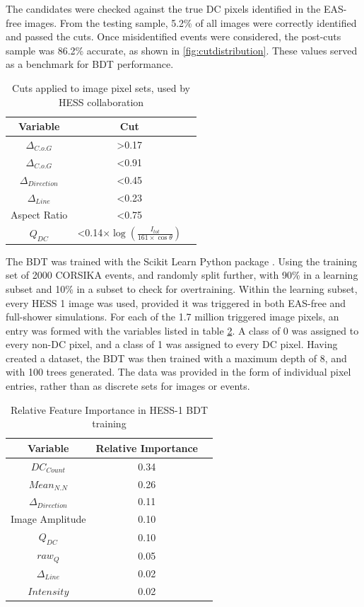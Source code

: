 \documentclass[]{article}
\begin{document}
The candidates were checked against the true DC pixels identified in the EAS-free images. From the testing sample, 5.2\% of all images were correctly identified and passed the cuts. Once misidentified events were considered, the post-cuts sample was 86.2\% accurate, as shown in \ref{fig:cutdistribution}. These values served as a benchmark for BDT performance. 

\begin{table}[h!]
  \centering
  \caption{Cuts applied to image pixel sets, used by HESS collaboration \cite{hess07}}
  \label{tab:table1}
  \begin{tabular}{ccc}
    \toprule
    Variable & Cut\\
    \midrule
     $ \Delta_{C.o.G}$ & \textgreater 0.17 \\
     $ \Delta_{C.o.G}$ & \textless 0.91 \\
     $\Delta_{Direction}$ & \textless 0.45 \\
     $\Delta_{Line}$ & \textless 0.23 \\
     Aspect Ratio & \textless 0.75 \\
     $Q_{DC}$ & \textless 0.14$ \times \log(\frac{I_{tot}}{161 \times \cos \theta})$ \\
    \bottomrule
  \end{tabular}
\end{table}

The BDT was trained with the Scikit Learn Python package \cite{scikit-learn}. Using the training set of 2000 CORSIKA events, and randomly split further, with 90\% in a learning subset and 10\% in a subset to check for overtraining. Within the learning subset, every HESS 1 image was used, provided it was triggered in both EAS-free and full-shower simulations. For each of the 1.7 million triggered image pixels, an entry was formed with the variables listed in table \ref{tab:table2}. A class of 0 was assigned to every non-DC pixel, and a class of 1 was assigned to every DC pixel. Having created a dataset, the BDT was then trained with a maximum depth of 8, and with 100 trees generated. The data was provided in the form of individual pixel entries, rather than as discrete sets for images or events.

\begin{table}[h!]
  \centering
  \caption{Relative Feature Importance in HESS-1 BDT training}
  \label{tab:table2}
  \begin{tabular}{ccc}
    \toprule
    Variable & Relative Importance\\
    \midrule
    $DC_{Count}$ & 0.34\\
    $Mean_{N.N}$ & 0.26\\
    $\Delta_{Direction}$ & 0.11\\
    Image Amplitude & 0.10\\
    $Q_{DC}$ & 0.10\\
    $raw_{Q}$ & 0.05\\
    $\Delta_{Line}$ & 0.02\\
    $Intensity$ & 0.02\\
    \bottomrule
  \end{tabular}
\end{table}
\end{document}
